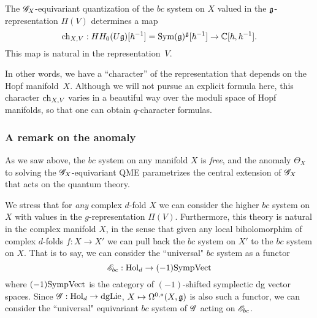 \begin{prop}\label{prop: twistedchar}
The $\mathscr G_X$-equivariant quantization of the $bc$ system on $X$ valued in the $\mathfrak g$-representation $\Pi(V)$ determines a map 
\[
{\rm ch}_{X,V} : HH_0(U \mathfrak g)[\hbar^{-1}] = {\rm Sym}(\mathfrak g)^{\mathfrak g} [\hbar^{-1}] \to \mathbb C[\hbar,\hbar^{-1}] .
\] 
This map is natural in the representation~$V$.
\end{prop}

In other words, we have a ``character'' of the representation that depends on the Hopf manifold~$X$.
Although we will not pursue an explicit formula here, 
this character ${\rm ch}_{X,V}$ varies in a beautiful way over the moduli space of Hopf manifolds,
so that one can obtain $q$-character formulas.


\subsubsection{A remark on the anomaly}\label{sec: hopfobs}

As we saw above, the $bc$ system on any manifold $X$ is {\em free}, and the anomaly $\Theta_X$ to solving the $\mathscr G_X$-equivariant QME parametrizes the central extension of $\mathscr G_X$ that acts on the quantum theory.


We stress that for {\em any} complex $d$-fold $X$ we can consider the higher $bc$ system on $X$ with values in the $g$-representation $\Pi(V)$. 
Furthermore, this theory is natural in the complex manifold $X$, in the sense that given any local biholomorphim of complex $d$-folds $f : X \to X'$ we can pull back the $bc$ system on $X'$ to the $bc$ system on $X$. 
That is to say, we can consider the ``universal" $bc$ system as a functor
\[
\mathscr E_{bc} : {\rm Hol}_d \to (-1){\rm SympVect}
\]
where $(-1){\rm SympVect}$ is the category of $(-1)$-shifted symplectic dg vector spaces. 
Since $\mathscr G : {\rm Hol}_d \to {\rm dgLie}$, $X \mapsto \Omega^{0,*}(X, \mathfrak g)$ is also such a functor, we can consider the ``universal" equivariant $bc$ system of $\mathscr G$ acting on $\mathscr E_{bc}$. 

